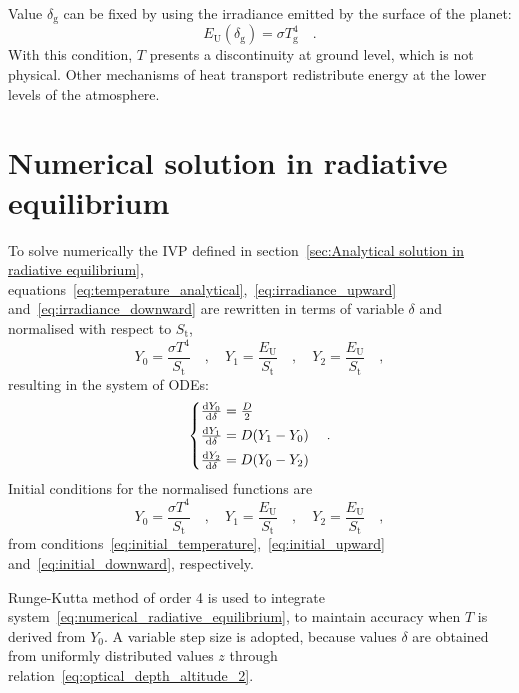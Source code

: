 \documentclass[a4paper,10pt,twocolumn,\classoptions]{article}
\begin{document}
Value $\delta_\text{g}$ can be fixed by using the irradiance emitted by the surface of the planet:
\begin{equation}
  \label{eq:irradiance_upward_ground}
  E_\text{U}(\delta_\text{g}) = \sigma T_\text{g}^4
  \quad .
\end{equation}
With this condition, $T$ presents a discontinuity at ground level, which is not physical. Other mechanisms of heat transport redistribute energy at the lower levels of the atmosphere.



\section{Numerical solution in radiative equilibrium}
\label{sec:Numerical solution in radiative equilibrium}
To solve numerically the IVP defined in section~\ref{sec:Analytical solution in radiative equilibrium}, equations~\eqref{eq:temperature_analytical},~\eqref{eq:irradiance_upward} and~\eqref{eq:irradiance_downward} are rewritten in terms of variable $\delta$ and normalised with respect to $S_\text{t}$,
\begin{equation}
  \label{eq:normalisation}
  Y_0 = \frac{\sigma T^4}{S_\text{t}}
  \quad , \quad
  Y_1 = \frac{E_\text{U}}{S_\text{t}}
  \quad , \quad
  Y_2 = \frac{E_\text{U}}{S_\text{t}}
  \quad ,
\end{equation}
resulting in the system of ODEs:
\begin{equation}
  \label{eq:numerical_radiative_equilibrium}
  \left\{
  \begin{array}{@{}l@{}}
    \odv{Y_0}{\delta} = \frac{D}{2} \\[0.5em]
    \odv{Y_1}{\delta} = D (Y_1 - Y_0) \\[0.5em]
    \odv{Y_2}{\delta} = D (Y_0 - Y_2)
  \end{array}
  \right.
  \quad .
\end{equation}
Initial conditions for the normalised functions are
\begin{equation}
  \label{eq:initial_normalisation}
  Y_0 = \frac{\sigma T^4}{S_\text{t}}
  \quad , \quad
  Y_1 = \frac{E_\text{U}}{S_\text{t}}
  \quad , \quad
  Y_2 = \frac{E_\text{U}}{S_\text{t}}
  \quad ,
\end{equation}
from conditions~\eqref{eq:initial_temperature},~\eqref{eq:initial_upward} and~\eqref{eq:initial_downward}, respectively.

Runge-Kutta method of order 4 is used to integrate system~\eqref{eq:numerical_radiative_equilibrium}, to maintain accuracy when $T$ is derived from $Y_0$. A variable step size is adopted, because values $\delta$ are obtained from uniformly distributed values $z$ through relation~\eqref{eq:optical_depth_altitude_2}.
\end{document}
